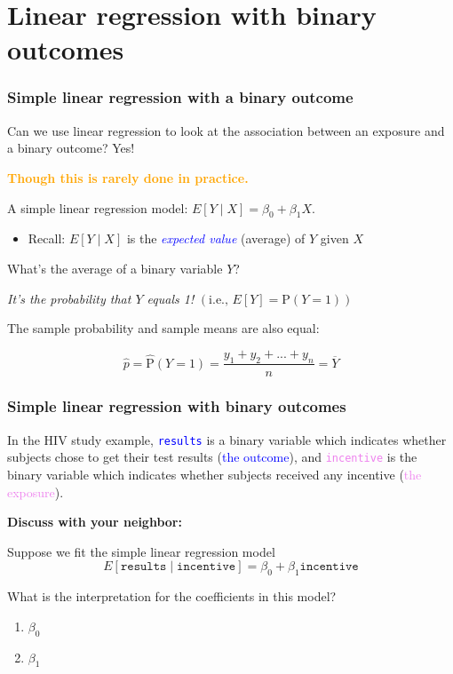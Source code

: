 \documentclass[10pt,t]{beamer}
\begin{document}
\section{Linear regression with binary outcomes}


\begin{frame}
	\frametitle{Simple linear regression with a binary outcome}
	Can we use linear regression to look at the association between an exposure and a binary outcome? Yes!
	\medskip
	
	\textbf{\textcolor{orange}{Though this is rarely done in practice.}}
	
	\bigskip
	

	
	A simple linear regression model: $E[Y \mid X] = \beta_0 + \beta_1 X$.
\medskip

		\begin{itemize}
			\item Recall: $E[Y \mid X]$ is the \textcolor{blue}{\textit{expected value}} (average) of $Y$ given $X$ 
		\end{itemize}

	 \bigskip
	 
	What's the average of a binary variable $Y$?   
	
	\medskip
	\textit{It's the probability that $Y$ equals 1!} $\left(\text{i.e., } E[Y] = \text{P}(Y=1)\right)$  
	\bigskip
	
	The sample probability and sample means are also equal:
	
\[\hat{p} = \hat{\text{P}}(Y=1) = \frac{y_1+y_2+...+y_n}{n} = \overline{Y} \]

\end{frame}

\begin{frame}
	\frametitle{Simple linear regression with binary outcomes}
	
		\vspace{-5 mm}
	
	In the HIV study example, \textcolor{blue}{\texttt{results}} is a binary variable which indicates whether subjects chose to get their test results (\textcolor{blue}{the outcome}), and \textcolor{violet}{\texttt{incentive}} is the binary variable which indicates whether subjects received any incentive (\textcolor{violet}{the exposure}).
	
	\medskip
	
	\textbf{Discuss with your neighbor:} 
\medskip

	
	Suppose we fit the simple linear regression model $$E[\texttt{results} \mid \texttt{incentive}] = \beta_0 + \beta_1 \texttt{incentive}$$ 
	
	What is the interpretation for the coefficients in this model?
	\medskip
	
	\begin{enumerate}
			\item $\beta_0$
			\medskip
			\item $\beta_1$
		\end{enumerate} 
\end{frame}
\end{document}
